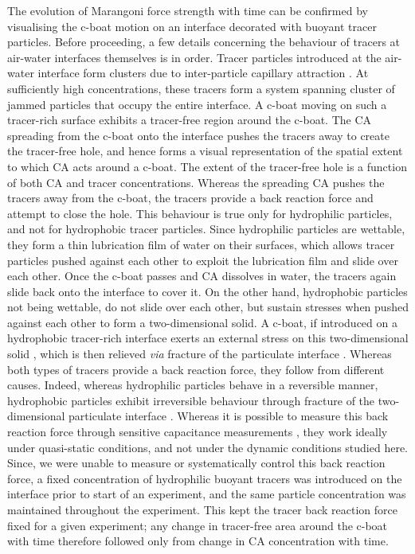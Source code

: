\documentclass[journal=langd5, manuscript=article, layout=twocolumn]{achemso}
\begin{document}
The evolution of Marangoni force strength with time can be confirmed by visualising the c-boat motion on an interface decorated with buoyant tracer particles. Before proceeding, a few details concerning the behaviour of tracers at air-water interfaces themselves is in order. Tracer particles introduced at the air-water interface form clusters due to inter-particle capillary attraction \cite{Vella2005}. At sufficiently high concentrations, these tracers form a system spanning cluster of jammed particles that occupy the entire interface. A c-boat moving on such a tracer-rich surface exhibits a tracer-free region around the c-boat. The CA spreading from the c-boat onto the interface pushes the tracers away to create the tracer-free hole, and hence forms a visual representation of the spatial extent to which CA acts around a c-boat. The extent of the tracer-free hole is a function of both CA and tracer concentrations. Whereas the spreading CA pushes the tracers away from the c-boat, the tracers provide a back reaction force and attempt to close the hole. This behaviour is true only for hydrophilic particles, and not for hydrophobic tracer particles. Since hydrophilic particles are wettable, they form a thin lubrication film of water on their surfaces, which allows tracer particles pushed against each other to exploit the lubrication film and slide over each other. Once the c-boat passes and CA dissolves in water, the tracers again slide back onto the interface to cover it. On the other hand, hydrophobic particles not being wettable, do not slide over each other, but sustain stresses when pushed against each other to form a two-dimensional solid. A c-boat, if introduced on a hydrophobic tracer-rich interface exerts an external stress on this two-dimensional solid \cite{Vella2004, Vella2006, mahadevan2011}, which is then relieved {\it via} fracture of the particulate interface \cite{Vella2006, mahadevan2011}. Whereas both types of tracers provide a back reaction force, they follow from different causes. Indeed, whereas hydrophilic particles behave in a reversible manner, hydrophobic particles exhibit irreversible behaviour through fracture of the two-dimensional particulate interface \cite{Vella2006, mahadevan2011}. Whereas it is possible to measure this back reaction force through sensitive capacitance measurements \cite{Varshney2012}, they work ideally under quasi-static conditions, and not under the dynamic conditions studied here. Since, we were unable to measure or systematically control this back reaction force, a fixed concentration of hydrophilic buoyant tracers was introduced on the interface prior to start of an experiment, and the same particle concentration was maintained throughout the experiment. This kept the tracer back reaction force fixed for a given experiment; any change in tracer-free area around the c-boat with time therefore followed only from change in CA concentration with time.
\end{document}
